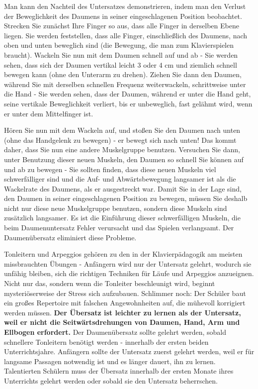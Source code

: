 Man kann den Nachteil des Untersatzes demonstrieren, indem man den Verlust der Beweglichkeit des Daumens in seiner eingeschlagenen Position beobachtet.
Strecken Sie zunächst Ihre Finger so aus, dass alle Finger in derselben Ebene liegen.
Sie werden feststellen, dass alle Finger, einschließlich des Daumens, nach oben und unten beweglich sind (die Bewegung, die man zum Klavierspielen braucht).
Wackeln Sie nun mit dem Daumen schnell auf und ab - Sie werden sehen, dass sich der Daumen vertikal leicht 3 oder 4 cm und ziemlich schnell bewegen kann (ohne den Unterarm zu drehen).
Ziehen Sie dann den Daumen, während Sie mit derselben schnellen Frequenz weiterwackeln, schrittweise unter die Hand - Sie werden sehen, dass der Daumen, während er unter die Hand geht, seine vertikale Beweglichkeit verliert, bis er unbeweglich, fast gelähmt wird, wenn er unter dem Mittelfinger ist.

Hören Sie nun mit dem Wackeln auf, und stoßen Sie den Daumen nach unten (ohne das Handgelenk zu bewegen) - er bewegt sich nach unten!
Das kommt daher, dass Sie nun eine andere Muskelgruppe benutzen.
Versuchen Sie dann, unter Benutzung dieser neuen Muskeln, den Daumen so schnell Sie können auf und ab zu bewegen - Sie sollten finden, dass diese neuen Muskeln viel schwerfälliger sind und die Auf- und Abwärtsbewegung langsamer ist als die Wackelrate des Daumens, als er ausgestreckt war.
Damit Sie in der Lage sind, den Daumen in seiner eingeschlagenen Position zu bewegen, müssen Sie deshalb nicht nur diese neue Muskelgruppe benutzen, sondern diese Muskeln sind zusätzlich langsamer.
Es ist die Einführung dieser schwerfälligen Muskeln, die beim Daumenuntersatz Fehler verursacht und das Spielen verlangsamt.
Der Daumenübersatz eliminiert diese Probleme.

Tonleitern und Arpeggios gehören zu den in der Klavierpädagogik am meisten missbrauchten Übungen - Anfängern wird nur der Untersatz gelehrt, wodurch sie unfähig bleiben, sich die richtigen Techniken für Läufe und Arpeggios anzueignen.
Nicht nur das, sondern wenn die Tonleiter beschleunigt wird, beginnt mysteriöserweise der Stress sich aufzubauen.
Schlimmer noch: Der Schüler baut ein großes Repertoire mit falschen Angewohnheiten auf, die mühevoll korrigiert werden müssen.
\textbf{Der Übersatz ist leichter zu lernen als der Untersatz, weil er nicht die Seitwärtsdrehungen von Daumen, Hand, Arm und Ellbogen erfordert.}
Der Daumenübersatz sollte gelehrt werden, sobald schnellere Tonleitern benötigt werden - innerhalb der ersten beiden Unterrichtsjahre.
Anfängern sollte der Untersatz zuerst gelehrt werden, weil er für langsame Passagen notwendig ist und es länger dauert, ihn zu lernen.
Talentierten Schülern muss der Übersatz innerhalb der ersten Monate ihres Unterrichts gelehrt werden oder sobald sie den Untersatz beherrschen.


